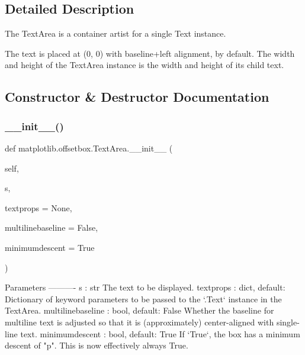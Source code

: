 \subsection{Detailed Description}
\begin{DoxyVerb}The TextArea is a container artist for a single Text instance.

The text is placed at (0, 0) with baseline+left alignment, by default. The
width and height of the TextArea instance is the width and height of its
child text.
\end{DoxyVerb}
 

\subsection{Constructor \& Destructor Documentation}
\mbox{\label{classmatplotlib_1_1offsetbox_1_1TextArea_ac71264e145ecf21220e76b356702ffdb}} 
\subsubsection{\texorpdfstring{\+\_\+\+\_\+init\+\_\+\+\_\+()}{\_\_init\_\_()}}
{\footnotesize\ttfamily def matplotlib.\+offsetbox.\+Text\+Area.\+\_\+\+\_\+init\+\_\+\+\_\+ (\begin{DoxyParamCaption}\item[{}]{self,  }\item[{}]{s,  }\item[{}]{textprops = {\ttfamily None},  }\item[{}]{multilinebaseline = {\ttfamily False},  }\item[{}]{minimumdescent = {\ttfamily True} }\end{DoxyParamCaption})}

\begin{DoxyVerb}Parameters
----------
s : str
    The text to be displayed.
textprops : dict, default: {}
    Dictionary of keyword parameters to be passed to the `.Text`
    instance in the TextArea.
multilinebaseline : bool, default: False
    Whether the baseline for multiline text is adjusted so that it
    is (approximately) center-aligned with single-line text.
minimumdescent : bool, default: True
    If `True`, the box has a minimum descent of "p".  This is now
    effectively always True.
\end{DoxyVerb}
 

